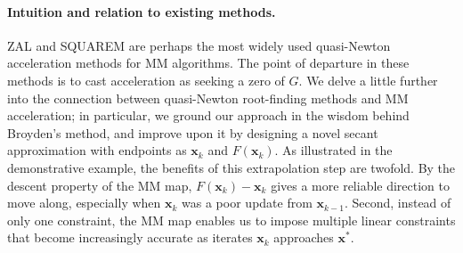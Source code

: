 \documentclass{statsoc}
\newcommand{\bx}{\boldsymbol{x}}
\begin{document}



\paragraph{Intuition and relation to existing methods.} 
 
ZAL and SQUAREM are perhaps the most widely used quasi-Newton acceleration methods for MM algorithms. The point of departure in these methods is to cast acceleration as seeking a zero of $G$. We delve a little further into the connection between quasi-Newton root-finding methods and MM acceleration; in particular, we ground our approach in the wisdom behind Broyden's method, and improve upon it by designing a novel secant approximation with endpoints as $\bx_k$ and $F(\bx_k)$. As illustrated in the demonstrative example, the benefits of this extrapolation step are twofold. By the descent property of the MM map, $F(\bx_k) - \bx_k$ gives a more reliable direction to move along, %
especially when $\bx_k$ was a  poor update from $\bx_{k-1}$. Second, instead of only one constraint, the MM map enables us to impose multiple linear constraints that become increasingly accurate as iterates $\bx_k$ approaches $\bx^\ast$. %
\end{document}
